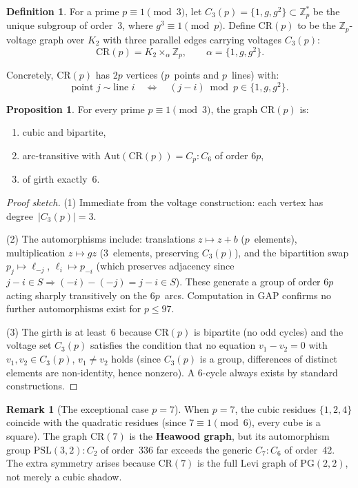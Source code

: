 \documentclass[11pt]{article}
\theoremstyle{definition}
\newtheorem{definition}{Definition}
\newtheorem{proposition}{Proposition}
\newtheorem{remark}{Remark}
\begin{document}
\begin{definition}
For a prime $p \equiv 1 \pmod{3}$, let $C_3(p) = \{1, g, g^2\} \subset \mathbb{Z}_p^*$
be the unique subgroup of order~3, where $g^3 \equiv 1 \pmod{p}$.
Define $\mathrm{CR}(p)$ to be the $\mathbb{Z}_p$-voltage graph over $K_2$ with three parallel edges
carrying voltages $C_3(p)$:
\[
\mathrm{CR}(p) = K_2 \times_\alpha \mathbb{Z}_p, \qquad
\alpha = \{1, g, g^2\}.
\]
\end{definition}

Concretely, $\mathrm{CR}(p)$ has $2p$ vertices ($p$~points and $p$~lines) with:
\[
\text{point } j \sim \text{line } i \quad \Longleftrightarrow \quad
(j - i) \bmod p \in \{1, g, g^2\}.
\]

\begin{proposition}
For every prime $p \equiv 1 \pmod{3}$, the graph $\mathrm{CR}(p)$ is:
\begin{enumerate}[nosep]
\item cubic and bipartite,
\item arc-transitive with $\mathrm{Aut}(\mathrm{CR}(p)) = C_p {:} C_6$ of order $6p$,
\item of girth exactly~$6$.
\end{enumerate}
\end{proposition}

\begin{proof}[Proof sketch]
(1) Immediate from the voltage construction: each vertex has degree~$|C_3(p)| = 3$.

(2) The automorphisms include: translations $z \mapsto z + b$ ($p$~elements),
multiplication $z \mapsto gz$ ($3$~elements, preserving $C_3(p)$),
and the bipartition swap $p_j \mapsto \ell_{-j}$, $\ell_i \mapsto p_{-i}$
(which preserves adjacency since $j - i \in S \Rightarrow (-i) - (-j) = j - i \in S$).
These generate a group of order $6p$ acting sharply transitively on the $6p$~arcs.
Computation in GAP confirms no further automorphisms exist for $p \leq 97$.

(3) The girth is at least~6 because $\mathrm{CR}(p)$ is bipartite (no odd cycles)
and the voltage set $C_3(p)$ satisfies the condition that no equation
$v_1 - v_2 = 0$ with $v_1, v_2 \in C_3(p)$, $v_1 \neq v_2$ holds (since $C_3(p)$ is a group,
differences of distinct elements are non-identity, hence nonzero).
A 6-cycle always exists by standard constructions.
\end{proof}

\begin{remark}[The exceptional case $p = 7$]
When $p = 7$, the cubic residues $\{1, 2, 4\}$ coincide with the quadratic residues
(since $7 \equiv 1 \pmod{6}$, every cube is a square).
The graph $\mathrm{CR}(7)$ is the \textbf{Heawood graph},
but its automorphism group $\mathrm{PSL}(3,2) {:} C_2$ of order~336
far exceeds the generic $C_7 {:} C_6$ of order~42.
The extra symmetry arises because $\mathrm{CR}(7)$ is the full Levi graph
of $\mathrm{PG}(2,2)$, not merely a cubic shadow.
\end{remark}
\end{document}
